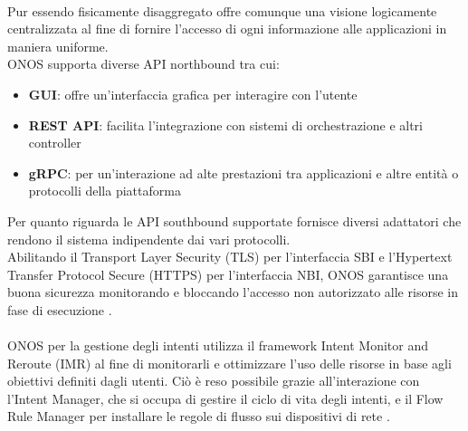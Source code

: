 \\Pur essendo fisicamente disaggregato offre comunque una visione logicamente centralizzata al fine di fornire l'accesso di ogni informazione alle applicazioni in maniera uniforme.
\\ONOS supporta diverse API northbound tra cui:
\begin{itemize}
\item \textbf{GUI}: offre un'interfaccia grafica per interagire con l'utente
\item \textbf{REST API}: facilita l'integrazione con sistemi di orchestrazione e altri controller 
\item \textbf{gRPC}: per un'interazione ad alte prestazioni tra applicazioni e altre entità o protocolli della piattaforma
\end{itemize}
Per quanto riguarda le API southbound supportate fornisce diversi adattatori che rendono il sistema indipendente dai vari protocolli.
\\Abilitando il Transport Layer Security (TLS) per l'interfaccia SBI e l'Hypertext Transfer Protocol Secure (HTTPS) per l'interfaccia NBI, 
ONOS garantisce una buona sicurezza monitorando e bloccando l'accesso non autorizzato alle risorse in fase di esecuzione \cite{artONOS}.
\\
\\ONOS per la gestione degli intenti utilizza il framework Intent Monitor and Reroute (IMR) al fine di monitorarli e ottimizzare l'uso delle risorse in base agli obiettivi definiti dagli utenti.
Ciò è reso possibile grazie all'interazione con l'Intent Manager, che si occupa di gestire il ciclo di vita degli intenti, e il Flow Rule Manager per installare le regole di flusso sui dispositivi di rete \cite{onosint}.
